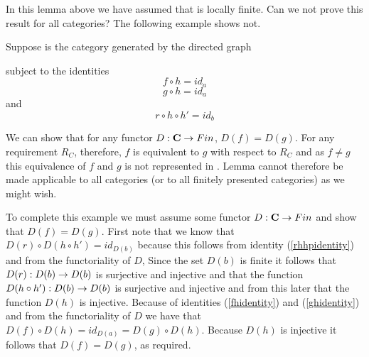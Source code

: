 In this lemma above we have assumed that \catcw is locally finite. Can we not prove this result for all categories? The following example shows not. 
\begin{example}
Suppose \catcw is the category generated by the directed graph

subject to the identities
\begin{equation}
\label{fhidentity}
f \circ h = id_a
\end{equation}
\begin{equation}
\label{ghidentity}
g \circ h = id_a
\end{equation}
and 
\begin{equation}
\label{rhhpidentity}
r \circ h \circ h' = id_b
\end{equation}

We can show that for any functor $D:\textbf{C} \rightarrow Fin$, $D(f)=D(g)$. For any requirement 
$R_C$, therefore, $f$ is equivalent to $g$ with respect to $R_C$ and as $f \neq g$ this equivalence of $f$ and $g$ 
is not represented in \catc. Lemma  cannot therefore be made applicable to all categories (or to all finitely presented categories) as we might wish.

To complete this example we must assume some functor $D:\textbf{C} \rightarrow Fin$ and show that $D(f)=D(g)$. 
First note that we know that $D(r) \circ D(h \circ h')=id_{D(b)}$ because this follows from
identity (\ref {rhhpidentity}) and from the functoriality of $D$, Since 
the set $D(b)$ is finite it follows that $D(r): D(b) \rightarrow D(b)$ is surjective and injective 
and that the function $D(h \circ h'):D(b) \rightarrow D(b)$ is surjective and injective and from this later
that the function $D(h)$ is injective.
Because of identities (\ref{fhidentity}) and (\ref{ghidentity}) and from the 
functoriality of $D$ we have that $D(f) \circ D(h) =id_{D(a)}=D(g) \circ D(h)$. Because $D(h)$ is injective it follows 
that $D(f)=D(g)$, as required.

\end{example}

